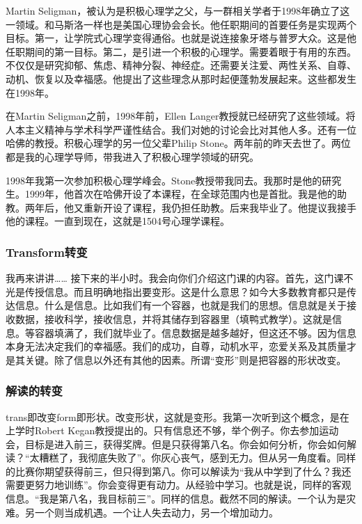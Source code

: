 Martin Seligman，被认为是积极心理学之父，与一群相关学者于1998年确立了这一领域。和马斯洛一样也是美国心理协会会长。他任职期间的首要任务是实现两个目标。第一，让学院式心理学变得通俗。也就是说连接象牙塔与普罗大众。这是他任职期间的第一目标。第二，是引进一个积极的心理学。需要着眼于有用的东西。不仅仅是研究抑郁、焦虑、精神分裂、神经症。还需要关注爱、两性关系、自尊、动机、恢复以及幸福感。他提出了这些理念从那时起便蓬勃发展起来。这些都发生在1998年。

在Martin Seligman之前，1998年前，Ellen Langer教授就已经研究了这些领域。将人本主义精神与学术科学严谨性结合。我们对她的讨论会比对其他人多。还有一位哈佛的教授。积极心理学的另一位父辈Philip Stone。两年前的昨天去世了。两位都是我的心理学导师，带我进入了积极心理学领域的研究。

1998年我第一次参加积极心理学峰会。Stone教授带我同去。我那时是他的研究生。1999年，他首次在哈佛开设了本课程，在全球范围内也是首批。我是他的助教。两年后，他又重新开设了课程，我仍担任助教。后来我毕业了。他提议我接手他的课程。一直到现在，这就是1504号心理学课程。

\subsubsection{Transform转变}
我再来讲讲…… 接下来的半小时。我会向你们介绍这门课的内容。首先，这门课不光是传授信息。而且明确地指出要变形。这是什么意思？如今大多数教育都只是传达信息。什么是信息。比如我们有一个容器，也就是我们的思想。信息就是关于接收数据，接收科学，接收信息，并将其储存到容器里（填鸭式教学）。这就是信息。等容器填满了，我们就毕业了。信息数据是越多越好，但这还不够。因为信息本身无法决定我们的幸福感。我们的成功，自尊，动机水平，恋爱关系及其质量才是其关键。除了信息以外还有其他的因素。所谓“变形”则是把容器的形状改变。

\subsubsection{解读的转变}
trans即改变form即形状。改变形状，这就是变形。我第一次听到这个概念，是在上学时Robert Kegan教授提出的。只有信息还不够，举个例子。你去参加运动会，目标是进入前三，获得奖牌。但是只获得第八名。你会如何分析，你会如何解读？“太糟糕了，我彻底失败了”。你灰心丧气，感到无力。但从另一角度看。同样的比赛你期望获得前三，但只得到第八。你可以解读为“我从中学到了什么？我还需要更努力地训练”。你会变得更有动力。从经验中学习。也就是说，同样的客观信息。“我是第八名，我目标前三”。同样的信息。截然不同的解读。一个认为是灾难。另一个则当成机遇。一个让人失去动力，另一个增加动力。

